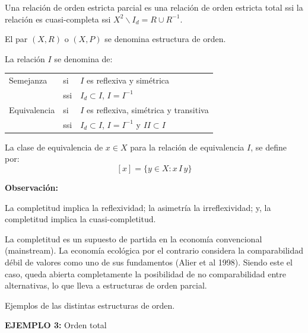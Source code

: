 \documentclass[a5paper,doc,10pt,noapacite]{apa6}
\begin{document}
{{\vspace{-1\baselineskip}

Una relación de orden estricta parcial es una relación de orden estricta total ssi la relación es cuasi-completa ssi \(X^2  \backslash  I_d = R \cup R^{-1}\).

El par \((X,R)\) o \((X,P)\) se denomina estructura de orden.

La relación \(I\) se denomina de:

\begin{table}[H]
\fontsize{7.5}{11}\selectfont
\begin{center}
	\begin{tabular}{l l l }
		Semejanza & si & \(I\) es reflexiva y simétrica \\
	    	      & ssi & \(I_d \subset I \), \(I = I^{-1} \)\\
		Equivalencia & si & \(I\) es reflexiva, simétrica y transitiva \\
	          	     & ssi & \(I_d \subset I \), \(I = I^{-1} \) y \(II \subset I\)\\[-1\baselineskip]
	\end{tabular}
\label{tab:B10} 
\end{center}
\end{table}

\vspace{-1\baselineskip}

La clase de equivalencia de \(x \in X\) para la relación de equivalencia \(I\), se define por:
\[
	[x] = \big\{y \in X : x \, I \, y \big\}
\]

\textbf{Observación:}

\begin{APAenumerate}
    \item La completitud implica la reflexividad; la asimetría la irreflexividad; y, la completitud implica la cuasi-completitud.
    \item La completitud es un supuesto de partida en la economía convencional (mainstream). La economía ecológica por el contrario considera la comparabilidad débil de valores como uno de sus fundamentos (Alier et al 1998). Siendo este el caso, queda abierta completamente la posibilidad de no comparabilidad entre alternativas, lo que lleva a estructuras de orden parcial.
\end{APAenumerate}


\vfill
\newpage

Ejemplos de las distintas estructuras de orden.


\vspace{1\baselineskip}
\textbf{EJEMPLO 3:} Orden total

}}
\end{document}
